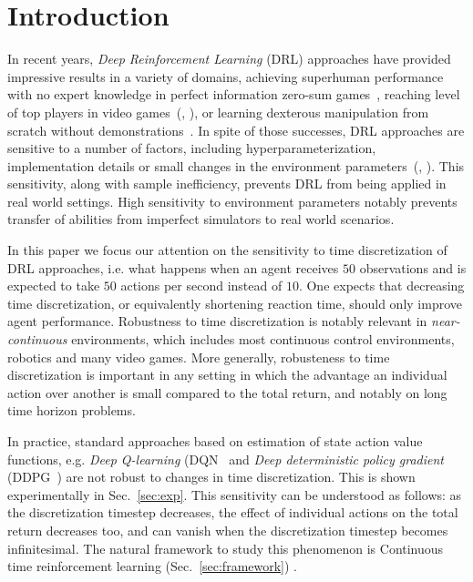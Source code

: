 
\section{Introduction}
\label{sec:intro}
In recent years, \emph{Deep Reinforcement Learning} (DRL) approaches have
provided impressive results in a variety of domains, achieving superhuman
performance with no expert knowledge in perfect information zero-sum
games~\cite{alphazero}, reaching level of top players in video
games~(\citealt{openai_five}, \citealt{dqn}), or learning dexterous manipulation
from scratch without demonstrations~\cite{hand_control}. 
In spite of those successes, DRL approaches are
sensitive to a number of factors, including hyperparameterization,
implementation details or small changes in the environment
parameters~(\citealt{drl_matter}, \citealt{drl_matter_bis}). This sensitivity,
along with sample inefficiency, prevents DRL from being applied in real
world settings. High sensitivity to environment parameters notably prevents
transfer of abilities from imperfect simulators to real world scenarios.

In this paper we focus our attention on the sensitivity to time discretization
of DRL approaches,
i.e. what happens when an agent receives $50$ observations
and is expected to take $50$ actions per second instead of $10$. One expects
that decreasing time discretization, or equivalently shortening reaction time,
should only improve agent performance. Robustness to time discretization is notably relevant in \emph{near-continuous}
environments, which includes most continuous control environments, robotics and many video games.
More generally, robusteness to time discretization is important in any setting in which the advantage
an individual action over another is small compared to the total return, and notably on long time horizon
problems.

In practice, standard approaches based on estimation of state action value functions, e.g.
\emph{Deep Q-learning} (DQN~\citep{dqn} and \emph{Deep deterministic policy
gradient} (DDPG~\citep{ddpg}) are not robust to changes in time discretization. This is shown experimentally in Sec.~\ref{sec:exp}. 
This sensitivity can be understood as follows: as the discretization timestep
decreases, the effect of individual actions on the total return decreases too, and
can vanish when the discretization timestep becomes infinitesimal. The natural
framework to study this phenomenon is Continuous time reinforcement learning 
(Sec.~\ref{sec:framework}) \cite{cont_rl, adv_upd}.

